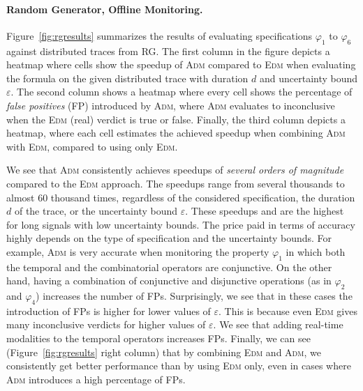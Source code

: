 \paragraph*{Random Generator, Offline Monitoring.}
Figure~\ref{fig:rgresults} summarizes the results of evaluating specifications $\varphi_1$ to $\varphi_6$ against distributed traces from RG.
The first column in the figure depicts a heatmap where cells show the speedup of \textsc{Adm} compared to \textsc{Edm} when evaluating the formula on the given distributed trace with duration $d$ and uncertainty bound $\varepsilon$.
The second column shows a heatmap where every cell shows the percentage of \emph{false positives} (FP) introduced by \textsc{Adm}, where \textsc{Adm} evaluates to inconclusive when the \textsc{Edm} (real) verdict is true or false.
Finally, the third column depicts a heatmap, where each cell estimates the achieved speedup when combining \textsc{Adm} with \textsc{Edm}, compared to using only \textsc{Edm}.


We see that \textsc{Adm} consistently achieves speedups of \emph{several orders of magnitude} 
compared to the \textsc{Edm} approach.
The speedups range from several thousands to almost 60 thousand times, regardless of the considered specification, the duration $d$ of the trace, or the uncertainty bound $\varepsilon$.
These speedups and are the highest for long signals with low uncertainty bounds.
The price paid in terms of accuracy highly depends on the type of specification and the uncertainty bounds.
For example, \textsc{Adm} is very accurate when monitoring the property $\varphi_1$ in which both the temporal and the combinatorial operators are conjunctive.
On the other hand, having a combination of conjunctive and disjunctive operations (as in $\varphi_{2}$ and $\varphi_{4}$) increases the number of FPs.
Surprisingly, we see that in these cases the introduction of FPs is higher for lower values of $\varepsilon$.
This is because even \textsc{Edm} gives many inconclusive verdicts for higher values of $\varepsilon$.
We see that adding real-time modalities to the temporal operators increases FPs.
Finally, we can see (Figure~\ref{fig:rgresults} right column) that by combining \textsc{Edm} and \textsc{Adm}, we consistently get better performance than by using \textsc{Edm} only, even in cases where \textsc{Adm} introduces a high percentage of FPs.

